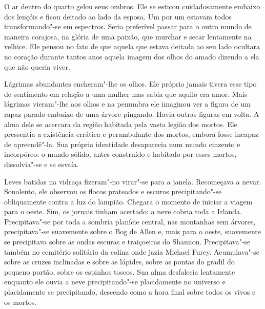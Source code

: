 O ar dentro do quarto gelou seus ombros.  Ele se esticou cuidadosamente embaixo
dos lençóis e ficou deitado ao lado da esposa.  Um por um estavam todos
transformando"-se em espectros.  Seria preferível passar para o outro mundo de
maneira corajosa, na glória de uma paixão, que murchar e secar lentamente na
velhice.  Ele pensou no fato de que aquela que estava deitada ao seu lado
ocultara no coração durante tantos anos aquela imagem dos olhos do amado
dizendo a ela que não queria viver.

Lágrimas abundantes encheram"-lhe os olhos.  Ele próprio jamais tivera esse tipo
de sentimento em relação a uma mulher mas sabia que aquilo era amor.  Mais
lágrimas vieram"-lhe aos olhos e na penumbra ele imaginou ver a figura de um
rapaz parado embaixo de uma árvore pingando.  Havia outras figuras em volta.  A
alma dele se acercara da região habitada pela vasta legião dos mortos.  Ele
pressentia a existência errática e perambulante dos mortos, embora fosse
incapaz de apreendê"-la.  Sua própria identidade desaparecia num mundo cinzento
e incorpóreo: o mundo sólido, antes construído e habitado por esses mortos,
dissolvia"-se e se esvaía.

Leves batidas na vidraça fizeram"-no virar"-se para a janela.  Recomeçava a
nevar.  Sonolento, ele observou os flocos prateados e escuros precipitando"-se
obliquamente contra a luz do lampião.  Chegara o momento de iniciar a viagem
para o oeste.  Sim, os jornais tinham acertado: a neve cobria toda a Irlanda.
Precipitava"-se por toda a sombria planície central, nas montanhas sem árvores,
precipitava"-se suavemente sobre o Bog de Allen e, mais para o oeste, suavemente
se precipitava sobre as ondas escuras e traiçoeiras do Shannon.  Precipitava"-se
também no cemitério solitário da colina onde jazia Michael Furey.  Acumulava"-se
sobre as cruzes inclinadas e sobre as lápides, sobre as pontas do gradil do
pequeno portão, sobre os espinhos toscos.  Sua alma desfalecia lentamente
enquanto ele ouvia a neve precipitando"-se placidamente no universo e
placidamente se precipitando, descendo como a hora final sobre todos os vivos e
os mortos.

\openright

